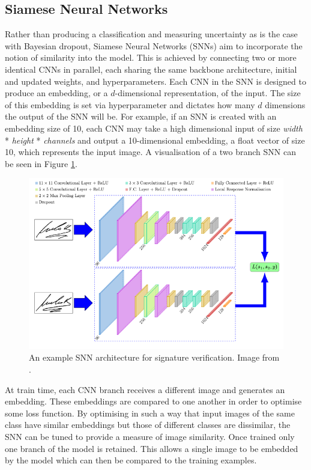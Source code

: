\subsection{Siamese Neural Networks}\label{ch:ID,sec:deciding,sub:SNN}

Rather than producing a classification and measuring uncertainty as is the case with Bayesian dropout, Siamese Neural Networks (SNNs) aim to incorporate the notion of similarity into the model. This is achieved by connecting two or more identical CNNs in parallel, each sharing the same backbone architecture, initial and updated weights, and hyperparameters. Each CNN in the SNN is designed to produce an embedding, or a  $d$-dimensional representation, of the input. The size of this embedding is set via hyperparameter and dictates how many $d$ dimensions the output of the SNN will be. For example, if an SNN is created with an embedding size of 10, each CNN may take a high dimensional input of size \textit{width} * \textit{height} * \textit{channels} and output a 10-dimensional embedding, a float vector of size 10, which represents the input image. A visualisation of a two branch SNN can be seen in Figure \ref{fig:signet-SNN-architecture}.

\begin{figure}
	\begin{center}
		\includegraphics[scale=0.4]{Chapter5/figs/signet-SNN-architecture.png}
	\end{center}
	\caption{An example SNN architecture for signature verification. Image from \cite{dey_signet_2017}.}
	\label{fig:signet-SNN-architecture}
\end{figure}

At train time, each CNN branch receives a different image and generates an embedding. These embeddings are compared to one another in order to optimise some loss function. By optimising in such a way that input images of the same class have similar embeddings but those of different classes are dissimilar, the SNN can be tuned to provide a measure of image similarity. Once trained only one branch of the model is retained. This allows a single image to be embedded by the model which can then be compared to the training examples.

